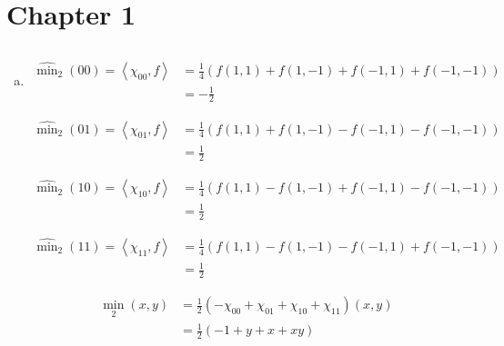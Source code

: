 \documentclass[12pt]{article}
\renewcommand{\ip}[1]{\left\langle#1\right\rangle}
\begin{document}
\section{Chapter 1}

\subsection{}

\begin{enumerate}[(a)]
    \item \begin{align*}
		     \widehat{\min}_2(00) = \ip{\chi_{00}, f} &= \frac{1}{4}(f(1,1) + f(1,-1) + f(-1,1) + f(-1,-1))\\
		     &= -\frac{1}{2}
	      \end{align*}

	      \begin{align*}
		     \widehat{\min}_2(01) = \ip{\chi_{01}, f} &= \frac{1}{4}(f(1,1) + f(1,-1) - f(-1,1) - f(-1,-1))\\
		     &= \frac{1}{2}
	      \end{align*}

	      \begin{align*}
		     \widehat{\min}_2(10) = \ip{\chi_{10}, f} &= \frac{1}{4}(f(1,1) - f(1,-1) + f(-1,1) - f(-1,-1))\\
		     &= \frac{1}{2}
	      \end{align*}

	      \begin{align*}
		     \widehat{\min}_2(11) = \ip{\chi_{11}, f} &= \frac{1}{4}(f(1,1) - f(1,-1) - f(-1,1) + f(-1,-1))\\
		     &= \frac{1}{2}
	      \end{align*}

	      \begin{align*}
	      	{\min}_2(x,y) &= \frac{1}{2}(-\chi_{00} + \chi_{01} + \chi_{10} + \chi_{11})(x,y)\\
	      	&= \frac{1}{2}(-1 + y + x + xy)
	      \end{align*}


\end{enumerate}
\end{document}
